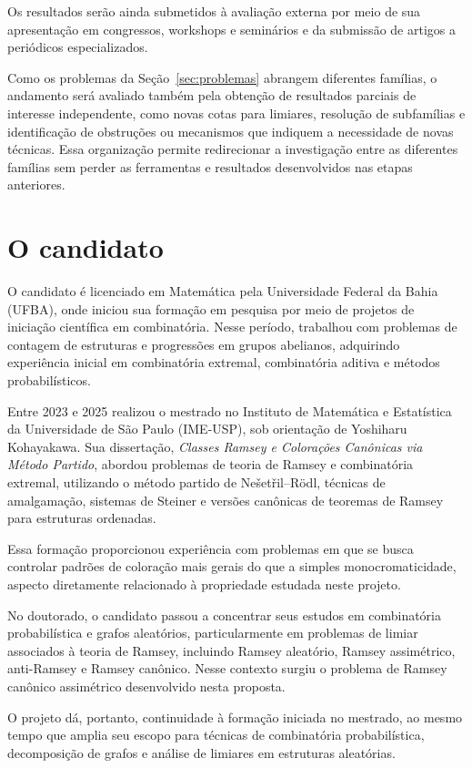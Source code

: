 \documentclass[11pt,a4paper]{article}
\theoremstyle{plain}
\theoremstyle{definition}
\begin{document}
Os resultados serão ainda submetidos à avaliação externa por meio de sua
apresentação em congressos, workshops e seminários e da submissão de artigos
a periódicos especializados.

Como os problemas da Seção~\ref{sec:problemas} abrangem diferentes famílias,
o andamento será avaliado também pela obtenção de resultados parciais de
interesse independente, como novas cotas para limiares, resolução de
subfamílias e identificação de obstruções ou mecanismos que indiquem a
necessidade de novas técnicas. Essa organização permite redirecionar a
investigação entre as diferentes famílias sem perder as ferramentas e
resultados desenvolvidos nas etapas anteriores.


\section{O candidato}


O candidato é licenciado em Matemática pela Universidade Federal da Bahia
(UFBA), onde iniciou sua formação em pesquisa por meio de projetos de
iniciação científica em combinatória. Nesse período, trabalhou com problemas
de contagem de estruturas e progressões em grupos abelianos, adquirindo
experiência inicial em combinatória extremal, combinatória aditiva e métodos
probabilísticos.

Entre 2023 e 2025 realizou o mestrado no Instituto de Matemática e Estatística
da Universidade de São Paulo (IME-USP), sob orientação de Yoshiharu
Kohayakawa. Sua dissertação, \emph{Classes Ramsey e Colorações Canônicas via
  Método Partido}, abordou problemas de teoria de Ramsey e combinatória
extremal, utilizando o método partido de Nešetřil--Rödl, técnicas de
amalgamação, sistemas de Steiner e versões canônicas de teoremas de Ramsey
para estruturas ordenadas.

Essa formação proporcionou experiência com problemas em que se busca
controlar padrões de coloração mais gerais do que a simples
monocromaticidade, aspecto diretamente relacionado à propriedade estudada
neste projeto.

No doutorado, o candidato passou a concentrar seus estudos em combinatória
probabilística e grafos aleatórios, particularmente em problemas de limiar
associados à teoria de Ramsey, incluindo Ramsey aleatório, Ramsey assimétrico,
anti-Ramsey e Ramsey canônico. Nesse contexto surgiu o problema de Ramsey
canônico assimétrico desenvolvido nesta proposta.

O projeto dá, portanto, continuidade à formação iniciada no mestrado, ao mesmo
tempo que amplia seu escopo para técnicas de combinatória probabilística,
decomposição de grafos e análise de limiares em estruturas aleatórias.
\end{document}
